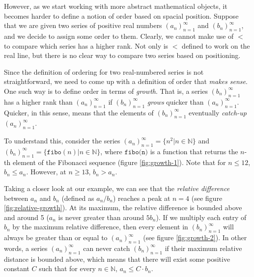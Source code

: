 \documentclass[11pt]{article}
\begin{document}
However, as we start working with more abstract mathematical objects, it becomes harder to define a notion of order based on spacial position. Suppose that we are given two series of positive real numbers $(a_n)_{n=1}^\infty$ and $(b_n)_{n=1}^\infty$, and we decide to assign some order to them. Clearly, we cannot make use of $<$ to compare which series has a higher rank. Not only is $<$ defined to work on the real line, but there is no clear way to compare two series based on positioning.

Since the definition of ordering for two real-numbered series is not straightforward, we need to come up with a definition of order that \textit{makes sense}. One such way is to define order in terms of \textit{growth}. That is, a series $(b_n)_{n=1}^\infty$ has a higher rank than $(a_n)_{n=1}^\infty$ if $(b_n)_{n=1}^\infty$ \textit{grows} quicker than $(a_n)_{n=1}^\infty$. Quicker, in this sense, means that the elements of $(b_n)_{n=1}^\infty$ eventually \textit{catch-up} $(a_n)_{n=1}^\infty$.

To understand this, consider the series $(a_n)_{n=1}^\infty = \{n^2 \vert n\in\mathbb{N}\}$ and $(b_n)_{n=1}^\infty = \{\texttt{fibo}(n) \vert n\in\mathbb{N}\}$, where $\texttt{fibo(n)}$ is a function that returns the $n$-th element of the Fibonacci sequence (figure \ref{fig:growth-1}). Note that for $n \leq 12$, $b_n \leq a_n$. However, at $n\geq 13$, $b_n > a_n$.


\begin{figure*}[h!]
	\centering
	\scalebox{0.5}{}
	\caption{Plot of two series. Although $(b_n)_{n=1}^\infty$ remains below or at levels of $(a_n)_{n=1}^\infty$, after $n=12$, the values of $(b_n)_{n=1}^\infty$ remain above the values of $(a_n)_{n=1}^\infty$. See text for context.}
	\label{fig:growth-1}
\end{figure*}

Taking a closer look at our example, we can see that the \textit{relative difference} between $a_n$ and $b_n$ (defined as $a_n / b_n$) reaches a peak at $n=4$ (see figure \ref{fig:relative-growth}). At its maximum, the relative difference is bounded above and around 5 ($a_n$ is never greater than around $5 b_n$). If we multiply each entry of $b_n$ by the maximum relative difference, then every element in $(b_n)_{n=1}^\infty$ will always be greater than or equal to $(a_n)_{n=1}^\infty$ (see figure \ref{fig:growth-2}). In other words, a series $(a_n)_{n=1}^\infty$ can never catch $(b_n)_{n=1}^\infty$ if their maximum relative distance is bounded above, which means that there will exist some positive constant $C$ such that for every $n\in\mathbb{N}$, $a_n \leq C \cdot b_n$.
\end{document}
